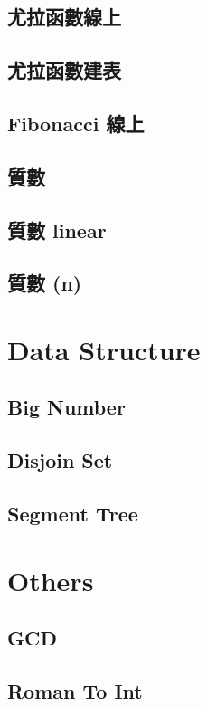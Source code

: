 \subsection{尤拉函數線上}

\subsection{尤拉函數建表}

\subsection{Fibonacci 線上}

\subsection{質數}

\subsection{質數 linear}

\subsection{質數 (n)}


\section{Data Structure}
\subsection{Big Number}

\subsection{Disjoin Set}

\subsection{Segment Tree}


\section{Others}
\subsection{GCD}

\subsection{Roman To Int}
